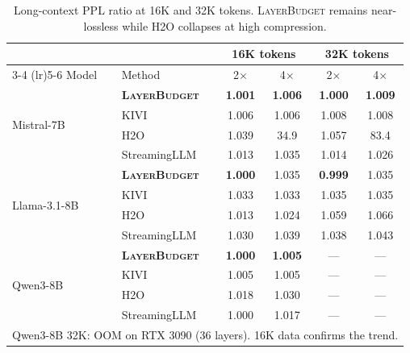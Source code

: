 \documentclass{article}
\newcommand{\layerbudget}{\textsc{LayerBudget}\xspace}
\begin{document}
\begin{table}[h]
\centering
\caption{Long-context PPL ratio at 16K and 32K tokens.  \layerbudget remains near-lossless while H2O collapses at high compression.}
\label{tab:longctx}
\small
\setlength{\tabcolsep}{3pt}
\begin{tabular}{@{}llcccc@{}}
\toprule
& & \multicolumn{2}{c}{16K tokens} & \multicolumn{2}{c}{32K tokens} \\
\cmidrule(lr){3-4} \cmidrule(lr){5-6}
Model & Method & 2$\times$ & 4$\times$ & 2$\times$ & 4$\times$ \\
\midrule
\multirow{4}{*}{Mistral-7B}
& \textbf{\layerbudget} & \textbf{1.001} & \textbf{1.006} & \textbf{1.000} & \textbf{1.009} \\
& KIVI          & 1.006 & 1.006 & 1.008 & 1.008 \\
& H2O           & 1.039 & 34.9  & 1.057 & 83.4 \\
& StreamingLLM  & 1.013 & 1.035 & 1.014 & 1.026 \\
\midrule
\multirow{4}{*}{Llama-3.1-8B}
& \textbf{\layerbudget} & \textbf{1.000} & 1.035 & \textbf{0.999} & 1.035 \\
& KIVI          & 1.033 & 1.033 & 1.035 & 1.035 \\
& H2O           & 1.013 & 1.024 & 1.059 & 1.066 \\
& StreamingLLM  & 1.030 & 1.039 & 1.038 & 1.043 \\
\midrule
\multirow{4}{*}{Qwen3-8B}
& \textbf{\layerbudget} & \textbf{1.000} & \textbf{1.005} & --- & --- \\
& KIVI          & 1.005 & 1.005 & --- & --- \\
& H2O           & 1.018 & 1.030 & --- & --- \\
& StreamingLLM  & 1.000 & 1.017 & --- & --- \\
\bottomrule
\multicolumn{6}{l}{\scriptsize Qwen3-8B 32K: OOM on RTX 3090 (36 layers). 16K data confirms the trend.}
\end{tabular}
\end{table}
\end{document}

